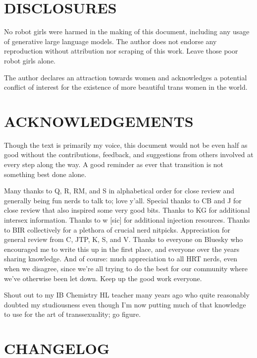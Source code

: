 \documentclass{article}
\begin{document}
 

\section*{DISCLOSURES}

No robot girls were harmed in the making of this document, including any usage of generative large language models. The author does not endorse any reproduction without attribution nor scraping of this work. Leave those poor robot girls alone.

The author declares an attraction towards women and acknowledges a potential conflict of interest for the existence of more beautiful trans women in the world.

 

\section*{ACKNOWLEDGEMENTS}

Though the text is primarily my voice, this document would not be even half as good without the contributions, feedback, and suggestions from others involved at every step along the way. A good reminder as ever that transition is not something best done alone.

Many thanks to Q, R, RM, and S in alphabetical order for close review and generally being fun nerds to talk to; love y’all. Special thanks to CB and J for close review that also inspired some very good bits. Thanks to KG for additional intersex information. Thanks to w [sic] for additional injection resources. Thanks to BIR collectively for a plethora of crucial nerd nitpicks. Appreciation for general review from C, JTP, K, S, and V. Thanks to everyone on Bluesky who encouraged me to write this up in the first place, and everyone over the years sharing knowledge. And of course: much appreciation to all HRT nerds, even when we disagree, since we’re all trying to do the best for our community where we’ve otherwise been let down. Keep up the good work everyone. 

Shout out to my IB Chemistry HL teacher many years ago who quite reasonably doubted my studiousness even though I’m now putting much of that knowledge to use for the art of transsexuality; go figure. 

 

\section*{CHANGELOG}
\end{document}
